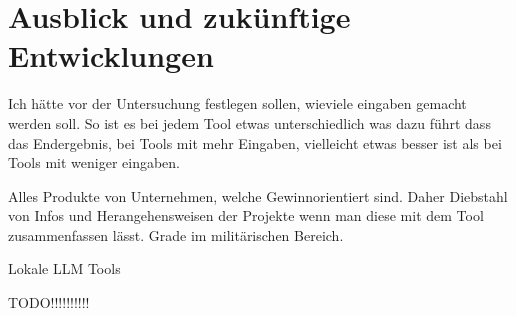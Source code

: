\section{Ausblick und zukünftige Entwicklungen}  \label{Ausblick und zukünftige Entwicklungen}

Ich hätte vor der Untersuchung festlegen sollen, wieviele eingaben gemacht werden soll. So ist es bei jedem Tool etwas unterschiedlich
was dazu führt dass das Endergebnis, bei Tools mit mehr Eingaben, vielleicht etwas besser ist als bei Tools mit weniger eingaben.

Alles Produkte von Unternehmen, welche Gewinnorientiert sind. Daher Diebstahl von Infos und Herangehensweisen der Projekte 
wenn man diese mit dem Tool zusammenfassen lässt. Grade im militärischen Bereich.

Lokale LLM Tools

TODO!!!!!!!!!!
